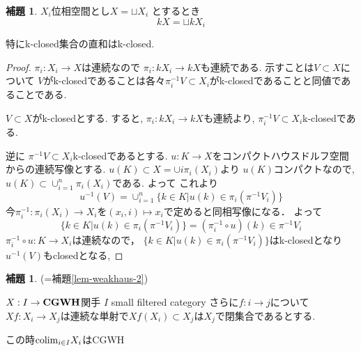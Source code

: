 \documentclass[dvipdfmx,a4paper,11pt]{article}
\newcommand{\colim}{{\rm colim}}
\theoremstyle{definition}
\newtheorem{lem}[thm]{補題}
\newcommand{\xr}[1]{\textcolor{red}{#1}}
\begin{document}
\begin{tcolorbox}
 [colback = white, colframe = green!35!black, fonttitle = \bfseries,breakable = true]
\begin{lem}
\label{lem-k-space}
$X_i$位相空間とし$X = \sqcup X_{i}$
とするとき
$$
kX = \sqcup kX_i
$$

特にk-closed集合の直和はk-closed.
\end{lem}
\end{tcolorbox}
\begin{proof}
$\pi_i : X_i \to X$は連続なので
$\pi_i : kX_i \to kX$も連続である.
示すことは$V \subset X$について
$V$がk-closedであることは各々$\pi_{i}^{-1}V \subset X_i$がk-closedであることと同値であることである. 

$V \subset X$がk-closedとする.
すると, $\pi_{i}: kX_i \to kX$も連続より, $\pi_{i}^{-1}V \subset X_i$k-closedである.

逆に $\pi^{-1}V \subset X_i$k-closedであるとする. 
$u : K\to X$をコンパクトハウスドルフ空間からの連続写像とする. 
$u(K) \subset X = \cup{i}\pi_{i}(X_i)$より
$u(K)$コンパクトなので, $u(K) \subset \cup_{i=1}^{n}\pi_{i}(X_i)$である.
よって
これより
$$
u^{-1}(V)
=\cup_{i=1}^{n}\{ k \in K | u(k) \in \pi_{i}( \pi^{-1}V_i) \}
$$
今$\pi_{i}^{-1}: \pi_{i}(X_i) \to X_i$を$(x_i, i) \mapsto x_i$で定めると同相写像になる．
よって
$$
\{ k \in K | u(k) \in \pi_{i}( \pi^{-1}V_i) \}
=
(\pi_{i}^{-1}\circ u)(k) \in \pi^{-1}V_i
$$
$\pi_{i}^{-1}\circ u : K \to X_i$は連続なので， $\{ k \in K | u(k) \in \pi_{i}( \pi^{-1}V_i) \}$はk-closedとなり
$u^{-1}(V)$もclosedとなる, 
\end{proof}


\begin{tcolorbox}
 [colback = white, colframe = green!35!black, fonttitle = \bfseries,breakable = true]

\begin{lem}\cite[Lemma 3.3]{Str}{(=補題\ref{lem-weakhaus-2})}

$X : I \to {\bf CGWH}$関手
$I$ small filtered category
さらに$f: i \to j$について$Xf : X_i \to X_j$は連続な単射で$Xf(X_i) \subset X_j$は$X_j$で閉集合であるとする. 

この時$\colim_{i \in I}X_i$はCGWH
\end{lem}
\end{tcolorbox}
\end{document}
